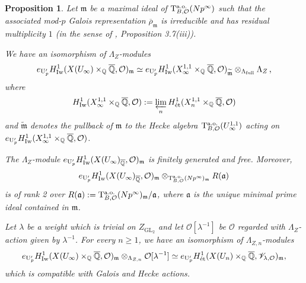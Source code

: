 \documentclass{amsart}
\numberwithin{equation}{section}
\newtheorem{proposition}[theorem]{Proposition}
\newcommand{\QQ}{\mathbb{Q}}
\newcommand{\GL}{\mathrm{GL}}
\newcommand{\etale}{\textup{\'et}}
\newcommand{\m}{\mathfrak{m}}
\newcommand{\Q}{\QQ}
\begin{document}
\begin{proposition} 
\label{prop_2025_07_04_1618} Let $\mathfrak{m}$ be a maximal ideal of $\mathrm{T}^{\rm a.o.}_{B,\mathcal{O}}(Np^\infty)$  such that the associated mod-$p$ Galois representation $\overline{\rho}_\mathfrak{m}$ is 
irreducible and has residual multiplicity $1$ (in the sense of \cite{Fouquet2013}, Proposition 3.7(iii)).
\item[i)] We have an isomorphism of $\Lambda_Z$-modules $$e_{{\rm U}_{p}'} H^1_{\rm Iw}( X(U_\infty)\times_{\QQ} \overline{\Q}, \mathcal{O})_\mathfrak{m} \simeq  e_{{\rm U}_{p}'} H^1_{\rm Iw}( X_\infty^{1,1}\times_{\QQ} \overline{\Q}, \mathcal{O})_{\widetilde{\mathfrak{m}}} \otimes_{\Lambda_{\rm full}} \Lambda_Z\,,$$
where
$$H^1_{\rm Iw}( X_\infty^{1,1}\times_{\QQ} \overline{\Q}, \mathcal{O}) : = \varprojlim_n H^1_{\etale}( X_n^{1,1}\times_{\QQ} \overline{\Q}, \mathcal{O})$$
 and $\widetilde{\mathfrak{m}}$ denotes the pullback of $\mathfrak{m}$ to the Hecke algebra $\mathrm{T}^{\rm a.o.}_{B,\mathcal{O}}(U_\infty^{1,1})$ acting on $e_{{\rm U}_{p}'} H^1_{\rm Iw}( X_\infty^{1,1}\times_{\QQ} \overline{\Q}, \mathcal{O})$.
 \item[ii)] The $\Lambda_{Z}$-module $e_{{\rm U}_{p}'} H^1_{\rm Iw}( X(U_\infty)_{\overline{\QQ}}, \mathcal{O})_\mathfrak{m}$ is finitely generated and free. Moreover,  $$ e_{{\rm U}_{p}'} H^1_{\rm Iw}( X(U_\infty)_{\overline{\QQ}}, \mathcal{O})_\mathfrak{m} \otimes_{\mathrm{T}^{\rm a.o.}_{B,\mathcal{O}}(Np^\infty)_\mathfrak{m}} R(\mathfrak{a})$$ is of rank 2 over $R(\mathfrak{a}):= \mathrm{T}^{\rm a.o.}_{B,\mathcal{O}}(Np^\infty)_\mathfrak{m} / \mathfrak{a}$, where $ \mathfrak{a}$ is the unique minimal prime ideal contained in $\m$. 
\item[iii)] Let $\lambda$ be a weight which is trivial on $Z_{\GL_2}$ and let $\mathcal{O}[\lambda^{-1}]$ be $\mathcal{O}$ regarded with $\Lambda_{Z}$-action given by $\lambda^{-1}$. For every $n \geq 1$, we have an isomorphism of $\Lambda_{Z,n}$-modules 
    $$e_{{\rm U}_{p}'} H^1_{\rm Iw}( X(U_\infty) \times_{\QQ} \overline{\Q}, \mathcal{O})_\mathfrak{m} \otimes_{\Lambda_{Z,n}} \mathcal{O}[\lambda^{-1}] \simeq e_{{\rm U}_{p}'} H^1_{\etale}( X(U_n) \times_{\QQ} \overline{\Q}, \mathscr{V}_{\lambda,\mathcal{O}})_\mathfrak{m},$$
    which is compatible with Galois and Hecke actions.

\end{proposition}
\end{document}
